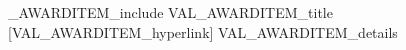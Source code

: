         \ifVAL_AWARDITEM_include
        {VAL_AWARDITEM_title}
        [VAL_AWARDITEM_hyperlink]
        VAL_AWARDITEM_details
        \fi
